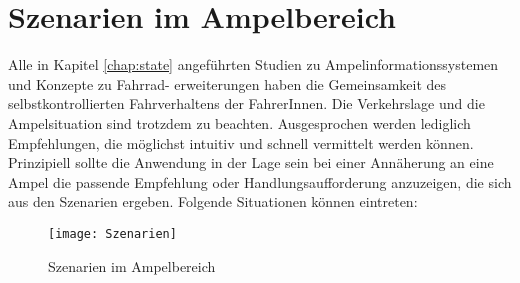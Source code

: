 \chapter{\label{chap:szenarien}Szenarien im Ampelbereich}
Alle in Kapitel \ref{chap:state} angeführten Studien zu Ampelinformationssystemen und Konzepte zu Fahrrad- erweiterungen haben die Gemeinsamkeit des selbstkontrollierten Fahrverhaltens der FahrerInnen. Die Verkehrslage und die Ampelsituation sind trotzdem zu beachten. Ausgesprochen werden lediglich Empfehlungen, die möglichst intuitiv und schnell vermittelt werden können.\\ 
Prinzipiell sollte die Anwendung in der Lage sein bei einer Annäherung an eine Ampel die passende Empfehlung oder Handlungsaufforderung anzuzeigen, die sich aus den Szenarien ergeben. Folgende Situationen können eintreten:\\
\begin{figure}[H]  
    \centering  
    \texttt{[image: Szenarien]} 
    \grayRule
    \caption[Szenarien]{Szenarien im Ampelbereich}
    \label{fig:szenarien}
\end{figure} \vspace{17pt}
